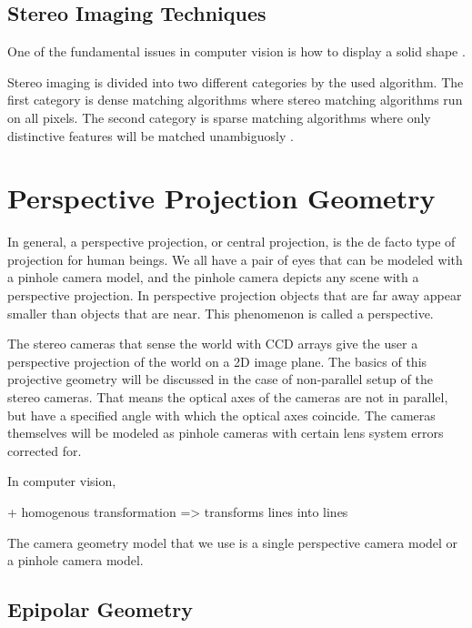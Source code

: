 \documentclass[12pt,a4paper,oneside,pdftex]{report}
\begin{document}
{\subsection{Stereo Imaging Techniques}
\label{subsection:stereo_imaging_techniques}

One of the fundamental issues in computer vision is how to display a solid shape \cite{Sonka07}. 

Stereo imaging is divided into two different categories by the used algorithm. The first category is dense matching algorithms where stereo matching algorithms run on all pixels. The second category is sparse matching algorithms where only distinctive features will be matched unambiguosly \cite{Terho10}.

\section{Perspective Projection Geometry}
\label{section:perspective_projection_geometry}

In general, a perspective projection, or central projection, is the de facto type of projection for human beings. We all have a pair of eyes that can be modeled with a pinhole camera model, and the pinhole camera depicts any scene with a perspective projection. In perspective projection objects that are far away appear smaller than objects that are near. This phenomenon is called a perspective. 

The stereo cameras that sense the world with CCD arrays give the user a perspective projection of the world on a 2D image plane. The basics of this projective geometry will be discussed in the case of non-parallel setup of the stereo cameras. That means the optical axes of the cameras are not in parallel, but have a specified angle with which the optical axes coincide. The cameras themselves will be modeled as pinhole cameras with certain lens system errors corrected for.

In computer vision, 

+ homogenous transformation => transforms lines into lines



The camera geometry model that we use is a single perspective camera model or a pinhole camera model.



\subsection{Epipolar Geometry}
\label{subsection:epipolar_geometry}

}
\end{document}
